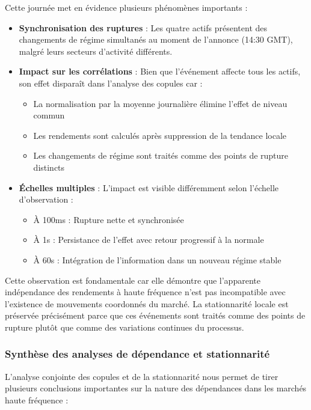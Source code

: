 \documentclass[12pt,a4paper]{article}
\theoremstyle{definition}
\theoremstyle{remark}
\begin{document}
Cette journée met en évidence plusieurs phénomènes importants :

\begin{itemize}
    \item \textbf{Synchronisation des ruptures} : Les quatre actifs présentent des changements de régime simultanés au moment de l'annonce (14:30 GMT), malgré leurs secteurs d'activité différents.
    
    \item \textbf{Impact sur les corrélations} : Bien que l'événement affecte tous les actifs, son effet disparaît dans l'analyse des copules car :
    \begin{itemize}
        \item La normalisation par la moyenne journalière élimine l'effet de niveau commun
        \item Les rendements sont calculés après suppression de la tendance locale
        \item Les changements de régime sont traités comme des points de rupture distincts
    \end{itemize}
    
    \item \textbf{Échelles multiples} : L'impact est visible différemment selon l'échelle d'observation :
    \begin{itemize}
        \item À 100ms : Rupture nette et synchronisée
        \item À 1s : Persistance de l'effet avec retour progressif à la normale
        \item À 60s : Intégration de l'information dans un nouveau régime stable
    \end{itemize}
\end{itemize}

Cette observation est fondamentale car elle démontre que l'apparente indépendance des rendements à haute fréquence n'est pas incompatible avec l'existence de mouvements coordonnés du marché. La stationnarité locale est préservée précisément parce que ces événements sont traités comme des points de rupture plutôt que comme des variations continues du processus.

\subsubsection{Synthèse des analyses de dépendance et stationnarité}

L'analyse conjointe des copules et de la stationnarité nous permet de tirer plusieurs conclusions importantes sur la nature des dépendances dans les marchés haute fréquence :
\end{document}
